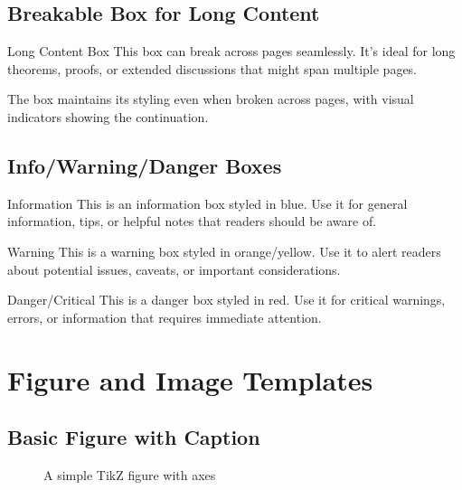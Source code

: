 \documentclass[a4paper,12pt]{article}
\begin{document}
\subsection{Breakable Box for Long Content}
\begin{breakablebox}{Long Content Box}
This box can break across pages seamlessly. It's ideal for long theorems, 
proofs, or extended discussions that might span multiple pages.

\lipsum[1]

The box maintains its styling even when broken across pages, with visual 
indicators showing the continuation.

\lipsum[2]
\end{breakablebox}

\subsection{Info/Warning/Danger Boxes}
\begin{infobox}{Information}
This is an information box styled in blue. Use it for general information, 
tips, or helpful notes that readers should be aware of.
\end{infobox}

\begin{warningbox}{Warning}
This is a warning box styled in orange/yellow. Use it to alert readers about 
potential issues, caveats, or important considerations.
\end{warningbox}

\begin{dangerbox}{Danger/Critical}
This is a danger box styled in red. Use it for critical warnings, errors, or 
information that requires immediate attention.
\end{dangerbox}

\section{Figure and Image Templates}

\subsection{Basic Figure with Caption}
\begin{figure}[H]
\centering
{}
\caption{A simple TikZ figure with axes}
\label{fig:basic}
\end{figure}
\end{document}
